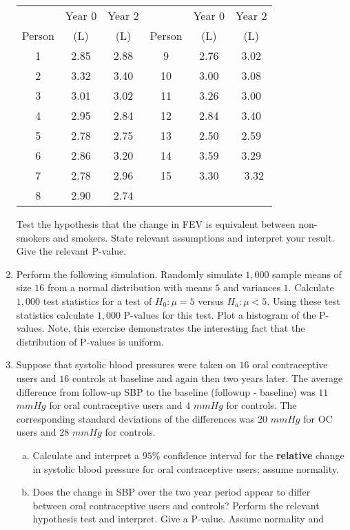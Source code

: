 \documentclass[12pt]{article}
\begin{document}
\begin{enumerate}[Problem 1.]
\begin{center}
\begin{tabular}{cccccc}
& Year 0 & Year 2 && Year 0 & Year 2 \\
Person & (L) & (L) & Person & (L) & (L) \vspace{+0.05in} \\ \hline
1 & 2.85 & 2.88 & 9 & 2.76 & 3.02 \\
2 & 3.32 & 3.40 & 10 & 3.00 & 3.08 \\
3 & 3.01 & 3.02 & 11 & 3.26 & 3.00 \\
4 & 2.95 & 2.84 & 12 & 2.84 & 3.40 \\
5 & 2.78 & 2.75 & 13 & 2.50 & 2.59 \\
6 & 2.86 & 3.20 & 14 & 3.59 & 3.29 \\
7 & 2.78 & 2.96 & 15 & 3.30 & \ 3.32 \\
8 & 2.90 & 2.74 &&& \vspace{+0.05in} \\ \hline
\end{tabular}
\end{center}
Test the hypothesis that the change in FEV is equivalent between
non-smokers and smokers. State relevant assumptions and interpret
your result. Give the relevant P-value.
\item Perform the following simulation. Randomly simulate $1,000$
  sample means of size $16$ from a normal distribution with means $5$
  and variances $1$. Calculate $1,000$ test statistics for a test of
  $H_0:\mu = 5$ versus $H_a:\mu< 5$. Using these test statistics calculate
  $1,000$ P-values for this test. Plot a histogram of the P-values. Note, this
  exercise demonstrates the interesting fact that the distribution of P-values is
  uniform.
\item  Suppose that systolic blood pressures were taken on $16$
oral contraceptive users and $16$ controls at baseline and again then
two years later. The average difference from follow-up SBP to the
baseline (followup - baseline) was $11$ $mmHg$ for oral contraceptive
users and $4$ $mmHg$ for controls.  The corresponding standard
deviations of the differences was $20$ $mmHg$ for OC users and $28$
$mmHg$ for controls.
\begin{enumerate}[a.]
\item Calculate and interpret a $95\%$ confidence interval for the
  {\bf relative} change in systolic blood pressure for oral
  contraceptive users; assume normality.
\item Does the change in SBP over the two year period appear to differ
  between oral contraceptive users and controls? Perform the relevant
  hypothesis test and interpret. Give a P-value. Assume normality and

\end{enumerate}
\end{enumerate}
\end{document}

